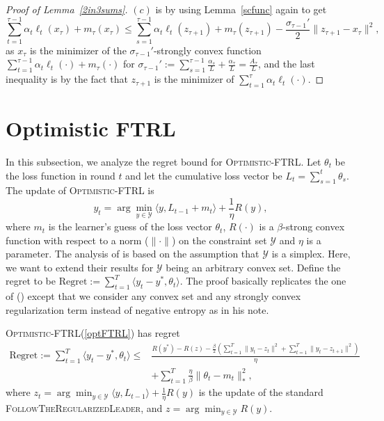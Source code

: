 \documentclass[final,12pt]{colt2018} %
\def\FTRL{\textsc{FollowTheRegularizedLeader}\xspace}
\def\OFTRL{\textsc{Optimistic-FTRL}\xspace}
\newcommand{\YY}{\mathcal{Y}}
\begin{document}
\begin{proof}[Proof of Lemma~\ref{2in3sums}]
$(c)$ is by using Lemma~\ref{scfunc} again to get
\begin{equation}
 \sum_{t=1}^{\tau-1} \alpha_t \ell_t (x_{\tau}) + m_\tau(x_\tau) \leq  \sum_{s=1}^{\tau-1}\alpha_t \ell_t (z_{\tau+1}) +m_\tau(z_{\tau+1}) - \frac{\sigma_{\tau-1}'}{2} \| z_{\tau+1} - x_\tau\|^2,
\end{equation}
as $x_\tau$ is the minimizer of the $\sigma_{\tau-1}'$-strongly convex function
$\sum_{t=1}^{\tau-1}\alpha_t \ell_t (\cdot) + m_{\tau}(\cdot)$ for $\sigma_{\tau-1}':= \sum_{s=1}^{\tau-1}\frac{\alpha_s}{L} + \frac{\alpha_\tau}{L}= \frac{A_{\tau}}{L}$,
and the last inequality is by the fact that $z_{\tau+1}$ is the minimizer of
$\sum_{t=1}^{\tau}\alpha_t \ell_t (\cdot) $.
\end{proof}



\section{Optimistic FTRL} \label{app:optFTRL}
In this subsection, we analyze the regret bound for \OFTRL.
Let $\theta_{t}$ be the loss function in round $t$ and let the cumulative loss vector be
$L_{t} = \sum_{s=1}^t \theta_{s}$.
The update of \OFTRL is
\begin{equation} \label{optFTRL}
y_t  = \arg \min_{y \in \YY} \langle y , L_{t-1} + m_t \rangle + \frac{1}{\eta} R(y),
\end{equation}
where 
$m_{t}$ is the learner's guess of the loss vector $\theta_{t}$,
$R(\cdot)$ is a $\beta$-strong convex function with respect to a norm ($\| \cdot \|$) on the constraint set $\YY$
and $\eta$ is a parameter. 
The analysis of \cite{SALS15} is based on the assumption that $\YY$ is a simplex.
Here, we want to extend their results for $\YY$ being an arbitrary convex set.
Define the regret to be $\text{Regret}:= \sum_{t=1}^{T} \langle y_t - y^{*}, \theta_{t} \rangle$.
The proof basically replicates the one of (\cite{HaipengLuo17}) except that we consider any convex set and any strongly convex regularization term instead of negative entropy as in his note.

\begin{theorem} \label{thm:oftrl}
\OFTRL (\ref{optFTRL}) has regret
\begin{equation} \label{opt-ftrl}
\begin{aligned}
\textstyle \text{Regret}:= \sum_{t=1}^{T} \langle y_t - y^{*}, \theta_{t} \rangle 
\leq & \textstyle \frac{  R(y^*) - R(z)  - \frac{\beta}{2} (\sum_{{t=1}}^{T} \| y_t - z_t \|^2 + \sum_{{t=1}}^{T} \| y_{t} - z_{t+1} \|^2)}{\eta} 
\\& \textstyle +\sum_{t=1}^{T} \frac{\eta}{\beta} \| \theta_t - m_{t} \|^2_* ,
\end{aligned}
\end{equation}
where $z_{t}= \arg\min_{y \in \YY} \langle y, L_{{t-1}} \rangle + \frac{1}{\eta} R(y)$ is the update of the standard \FTRL,
and $z = \arg\min_{y \in \YY} R(y)$.
\end{theorem}
\end{document}
